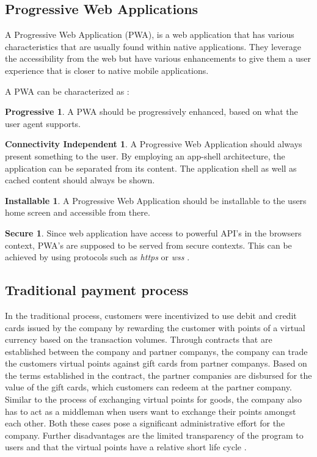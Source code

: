\subsection{Progressive Web Applications}\label{pwacharacteristics}
A Progressive Web Application (PWA), is a web application that has various characteristics that are usually found within native applications.
They leverage the accessibility from the web but have various enhancements to give them a user experience that is closer to native mobile applications.

A PWA can be characterized as \cite{pwas}:

\theoremstyle{definition}
\newtheorem*{theorem-progressive}{Progressive}
\newtheorem*{theorem}{Connectivity Independent}
\newtheorem*{theorem-install}{Installable}
\newtheorem*{theorem-secure}{Secure}

\begin{theorem-progressive}
A PWA should be progressively enhanced, based on what the user agent supports.
\end{theorem-progressive}

\begin{theorem}
A Progressive Web Application should always present something to the user. By employing an app-shell architecture, the application can be separated from its content. The application shell as well as cached content should always be shown.
\end{theorem}
\begin{theorem-install}
A Progressive Web Application should be installable to the users home screen and accessible from there.

\end{theorem-install}
\begin{theorem-secure}
Since web application have access to powerful API's in the browsers context, PWA's are supposed to be served from secure contexts. This can be achieved by using protocols such as \textit{https} or \textit{wss} \cite{securitychrome}.

\end{theorem-secure}
\subsection{Traditional payment process}
In the traditional process, customers were incentivized to use debit and credit cards issued by the company by rewarding the customer with points of a virtual currency based on the transaction volumes.
Through contracts that are established between the company and partner companys, the company can trade the customers virtual points against gift cards from partner companys.
Based on the terms established in the contract, the partner companies are disbursed for the value of the gift cards, which customers can redeem at the partner company.
Similar to the process of exchanging virtual points for goods, the company also has to act as a middleman when users want to exchange their points amongst each other. Both these cases pose a significant administrative effort for the company. Further disadvantages are the limited transparency of the program to users and that the virtual points have a relative short life cycle \cite{lisg}.

